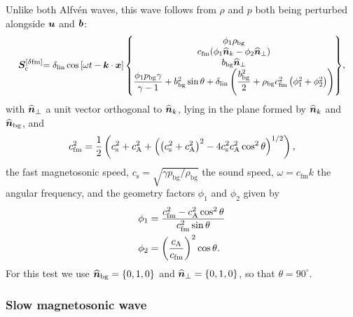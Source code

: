 Unlike both Alfv\'en waves, this wave follows from $\rho$ and $p$ both being perturbed alongside $\bm{u}$ and $\bm{b}$:
\begin{align}
    \mVector{S}_\mathrm{c}^{[\delta\mathrm{fm}]}
        \scalebox{0.925}{$\displaystyle
        = \delta_\mathrm{lin} \cos\sbrac{
                \omega t - \mVector{k}\cdot\mVector{x}
            }
            \begin{Bmatrix}
                \phi_1 \rho_\mathrm{bg} \\
                c_\mathrm{fm} (
                        \phi_1 \mVectorUnit{n}_{k} - \phi_2 \mVectorUnit{n}_\perp
                    ) \\
                b_\mathrm{bg} \mVectorUnit{n}_\perp \\
                \dfrac{\phi_1 p_\mathrm{bg} \gamma}{\gamma-1}
                    + b_\mathrm{bg}^2\sin\theta
                    + \delta_\mathrm{lin} \rbrac{
                        \dfrac{b_\mathrm{bg}^2}{2}
                        + \rho_\mathrm{bg} c_\mathrm{fm}^2 \rbrac{\phi_1^2 + \phi_2^2}
                    }
        \end{Bmatrix}
        $}
    ,
\end{align}
with $\widehat{\bm{n}}_\perp$ a unit vector orthogonal to $\widehat{\bm{n}}_{k}$, lying in the plane formed by $\widehat{\bm{n}}_{k}$ and $\widehat{\bm{n}}_\mathrm{bg}$, and
\begin{align}
    c_\mathrm{fm}^2
        = \frac{1}{2} \left( 
            c_\mathrm{s}^2 + c_\mathrm{A}^2 + \left( 
                \left( 
                    c_\mathrm{s}^2 + c_\mathrm{A}^2
                 \right)^2 - 4 c_\mathrm{s}^2 c_\mathrm{A}^2 \cos^2\theta
             \right)^{1/2}
         \right)
    , \label{eqn:waves:fast-speed}
\end{align}
the fast magnetosonic speed, $c_\mathrm{s} = \sqrt{\gamma p_\mathrm{bg} / \rho_\mathrm{bg}}$ the sound speed, $\omega = c_\mathrm{fm} k$ the angular frequency, and the geometry factors $\phi_1$ and $\phi_2$ given by
\begin{align}
    \phi_1
        &= \frac{c_\mathrm{fm}^2 - c_\mathrm{A}^2 \cos^2\theta}{c_\mathrm{fm}^2 \sin\theta} \\
    \phi_2
        &= \left( \frac{c_\mathrm{A}}{c_\mathrm{fm}} \right)^2 \cos\theta
    .
\end{align}
For this test we use $\widehat{\bm{n}}_\mathrm{bg} = \{0,1,0\}$ and $\widehat{\bm{n}}_\perp = \{0,1,0\}$, so that $\theta = 90^\circ$.

\subsubsection{Slow magnetosonic wave}
\label{sec:scheme-comparison:waves:slow}

